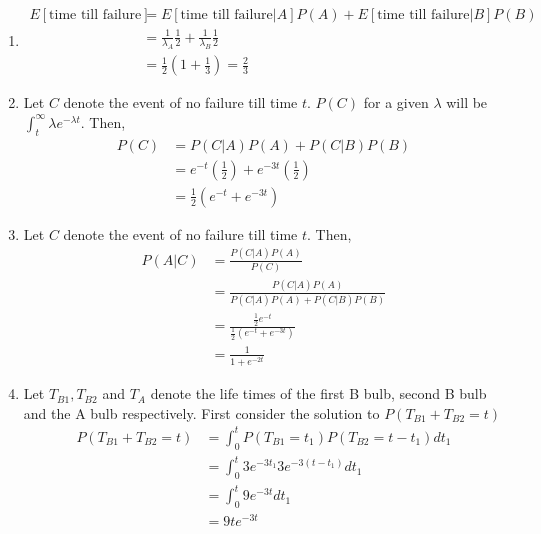 \documentclass[../../probability-notes.tex]{subfiles}
\begin{document}
        \begin{enumerate}
            \item
            \begin{align*}
                E[\text{time till failure}] &= E[\text{time till failure}|A]P(A) + E[\text{time till failure}|B]P(B)\\
                &= \frac{1}{\lambda_{A}} \frac{1}{2} + \frac{1}{\lambda_{B}} \frac{1}{2}\\
                &= \frac{1}{2}(1 + \frac{1}{3}) = \frac{2}{3}
            \end{align*}

            \item Let $C$ denote the event of no failure till time $t$. $P(C)$ for a given $\lambda$ will be $\int_{t}^{\infty} \lambda e^{-\lambda t}$. Then,
            \begin{align*}
                P(C) &= P(C|A)P(A) + P(C|B)P(B) \tag*{Using total probability theorem}\\
                     &= e^{-t}(\frac{1}{2}) + e^{-3t}(\frac{1}{2})\\
                     &= \frac{1}{2}(e^{-t} + e^{-3t})
            \end{align*}

            \item \label{itm:a_poissonbulb2_c} Let $C$ denote the event of no failure till time $t$. Then,
            \begin{align*}
                P(A|C) &= \frac{P(C|A)P(A)}{P(C)}\\
                       &= \frac{P(C|A)P(A)}{P(C|A)P(A) + P(C|B)P(B)}\\
                       &= \frac{\frac{1}{2} e^{-t}}{\frac{1}{2}(e^{-t} + e^{-3t})}\\
                       &= \frac{1}{1 + e^{-2t}}
            \end{align*}

            \item Let $T_{B1}, T_{B2}$ and $T_{A}$ denote the life times of the first B bulb, second B bulb and the A bulb respectively. First consider the solution to $P(T_{B1} + T_{B2} = t)$
            \begin{align*}
                P(T_{B1} + T_{B2} = t) &= \int_{0}^{t} P(T_{B1} = t_{1})P(T_{B2} = t - t_{1}) dt_{1} \tag*{Using independence}\\
                &= \int_{0}^{t} 3e^{-3t_{1}} 3e^{-3(t - t_{1})} dt_{1}\\
                &= \int_{0}^{t} 9e^{-3t}dt_{1}\\
                &= 9te^{-3t}
            \end{align*}


\end{enumerate}
\end{document}
